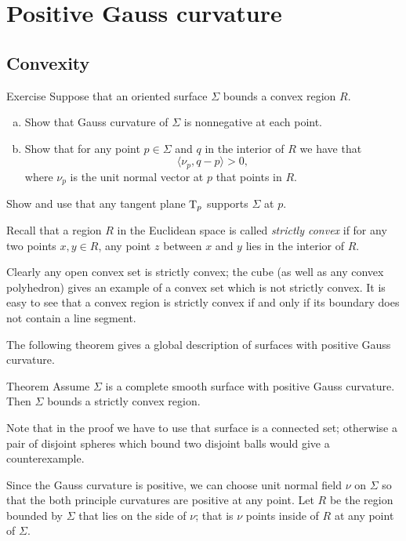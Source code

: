 \chapter{Positive Gauss curvature}


\section*{Convexity}

\begin{thm}{Exercise}\label{ex:convex-surf}
Suppose that an oriented surface $\Sigma$ bounds a convex region $R$.
\begin{enumerate}[(a)]
\item Show that  Gauss curvature of $\Sigma$ is nonnegative at each point.
\item Show that for any point $p\in \Sigma$ and $q$ in the interior of $R$ we have that
\[\langle \nu_p,q-p\rangle>0,\]
where $\nu_p$ is the  unit normal vector at $p$ that points in $R$.
\end{enumerate}

\end{thm}

 Show and use that any tangent plane $\mathrm{T}_p$ supports $\Sigma$ at $p$.

Recall that a region $R$ in the Euclidean space is called  \emph{strictly convex} if for any two points $x,y\in R$, any point $z$ between $x$ and $y$ lies in the interior of $R$.

Clearly any open convex set is strictly convex;
the cube (as well as any convex polyhedron) gives an example of a convex set which is not strictly convex.
It is easy to see that a convex region is strictly convex if and only if its boundary does not contain a line segment.

The following theorem gives a global description of surfaces with positive Gauss curvature.

\begin{thm}{Theorem}\label{thm:convex-embedded}
Assume $\Sigma$ is a complete smooth surface with positive Gauss curvature.
Then $\Sigma$ bounds a strictly convex region.
\end{thm}

Note that in the proof we have to use that surface is a connected set;
otherwise a pair of disjoint spheres which bound two disjoint balls would give a counterexample.

Since the Gauss curvature is positive, we can choose unit normal field $\nu$ on $\Sigma$ so that the both principle curvatures are positive at any point.
Let $R$ be the region bounded by $\Sigma$ that lies on the side of $\nu$;
that is $\nu$ points inside of $R$ at any point of $\Sigma$.

